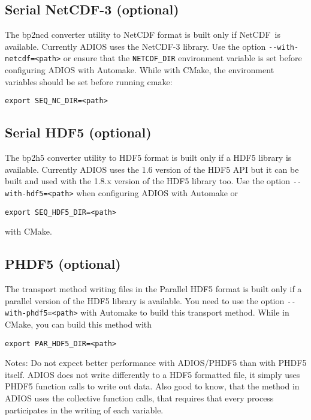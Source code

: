 \subsection{Serial NetCDF-3 (optional)}

The bp2ncd converter utility to NetCDF format is built only if NetCDF~is available.
 Currently ADIOS uses the NetCDF-3 library. Use the option \verb+--with-netcdf=<path>+
or ensure that the \verb+NETCDF_DIR+ environment variable is set before configuring ADIOS with Automake.
While with CMake, the environment variables should be set before running cmake:
\begin{lstlisting}
export SEQ_NC_DIR=<path>
\end{lstlisting}

\subsection{Serial HDF5 (optional)}

The bp2h5 converter utility to HDF5 format is built only if a HDF5 library is available.
Currently ADIOS uses the 1.6 version of the HDF5 API but it can be built and used
with the 1.8.x version of the HDF5 library too. Use the option \verb+--with-hdf5=<path>+
when configuring ADIOS with Automake or
\begin{lstlisting}
export SEQ_HDF5_DIR=<path>
\end{lstlisting}
\noindent with CMake.


\subsection{PHDF5 (optional)}

The transport method writing files in the Parallel HDF5 format is built only if
a parallel version of the HDF5 library is available. You need to use the
option \verb+--with-phdf5=<path>+ with Automake to build this transport method.
While in CMake, you can build this method with
\begin{lstlisting}
export PAR_HDF5_DIR=<path>
\end{lstlisting}

\noindent Notes: Do not expect better performance with ADIOS/PHDF5 than with PHDF5 itself. ADIOS does not write differently to a HDF5 formatted file, it simply uses PHDF5 function calls to write out data. Also good to know, that the method in ADIOS uses the collective function calls, that requires that every process participates in the writing of each variable.

